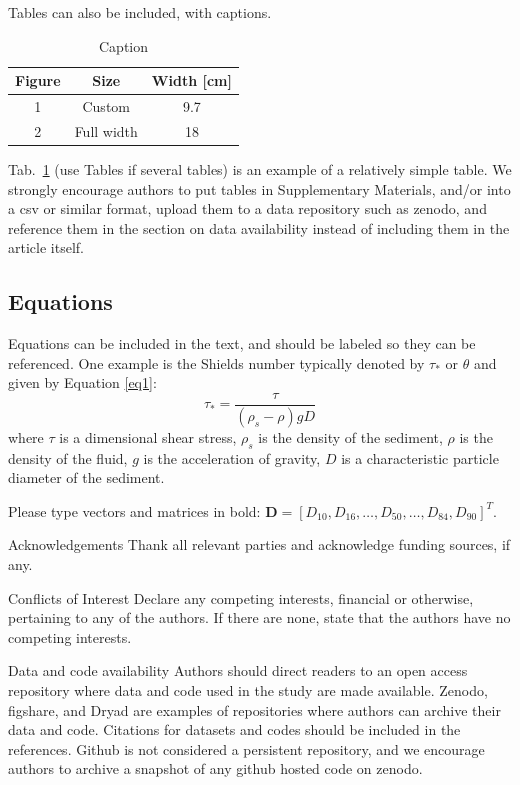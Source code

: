 \documentclass{article}
\begin{document}
Tables can also be included, with captions.
\begin{table}[ht!]
    \caption{Caption}
	\begin{tabular}{ccc}
		Figure    & Size & Width [cm]  \\
		\hline
		1 & Custom &  9.7 \\
		2 & Full width &  18 \\
	\end{tabular}
	\label{tab:1}
\end{table}

Tab.~\ref{tab:1} (use Tables if several tables) is an example of a relatively simple table. We strongly encourage authors to put tables in Supplementary Materials, and/or into a csv or similar format, upload them to a data repository such as zenodo, and reference them in the section on data availability instead of including them in the article itself. 
	
\subsection{Equations}
Equations can be included in the text, and should be labeled so they can be referenced. One example is the Shields number typically denoted by  $\tau_ *$ or $ \theta$ and given by Equation \ref{eq1}:
\begin{equation}\label{eq1}
	\tau_* = \frac{\tau}{\left(\rho_s - \rho \right)gD}
\end{equation}
where $\tau$ is a dimensional shear stress, $\rho_s$ is the density of the sediment, $\rho$ is the density of the fluid, $g$ is the acceleration of gravity, $D$ is a characteristic particle diameter of the sediment.
	
Please type vectors and matrices in bold: $\mathbf{D} = \left[D_{10}, D_{16}, \ldots, D_{50}, \ldots, D_{84}, D_{90} \right]^T$.
  
\begin{closing}{Acknowledgements}
    Thank all relevant parties and acknowledge funding sources, if any.
\end{closing}
\begin{closing}{Conflicts of Interest}
    Declare any competing interests, financial or otherwise, pertaining to any of the authors. If there are none, state that the authors have no competing interests.
\end{closing}
\begin{closing}{Data and code availability}
	Authors should direct readers to an open access repository where data and code used in the study are made available. Zenodo, figshare, and Dryad are examples of repositories where authors can archive their data and code. Citations for datasets and codes should be included in the references. Github is not considered a persistent repository, and we encourage authors to archive a snapshot of any github hosted code on zenodo.
\end{closing}

\end{document}
